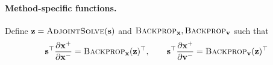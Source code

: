 \paragraph{Method-specific functions.} Define $\mathbf{z} = \textsc{AdjointSolve}(\mathbf{s})$ and $\textsc{Backprop}_{\mathbf{x}}, \textsc{Backprop}_{\mathbf{v}}$ such that
\begin{equation*}
    \mathbf{s}^\top\frac{\partial \mathbf{x}^+}{\partial \mathbf{x}^-} = \textsc{Backprop}_{\mathbf{x}}(\mathbf{z})^\top,
    \qquad
    \mathbf{s}^\top\frac{\partial \mathbf{x}^+}{\partial \mathbf{v}^-} = \textsc{Backprop}_{\mathbf{v}}(\mathbf{z})^\top
\end{equation*}

